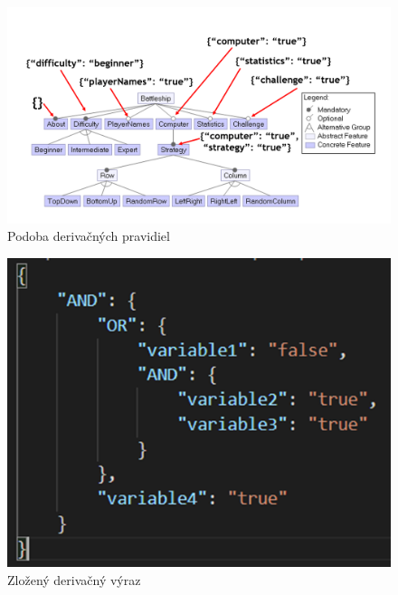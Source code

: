 \documentclass[11pt,slovak,a4paper,twoside]{article}
\begin{document}
\begin{figure}[H]  %
					\begin{center}
									\includegraphics[width=\linewidth]{fig/derivationRules.png}
									\caption{Podoba derivačných pravidiel}
									\label{derivationRules}
					\end{center}
\end{figure}

\begin{figure}[H]  %
					\begin{center}
									\includegraphics[width=\linewidth]{fig/expresion.png}
									\caption{Zložený derivačný výraz}
									\label{derivationRule}
					\end{center}
\end{figure}
\end{document}
